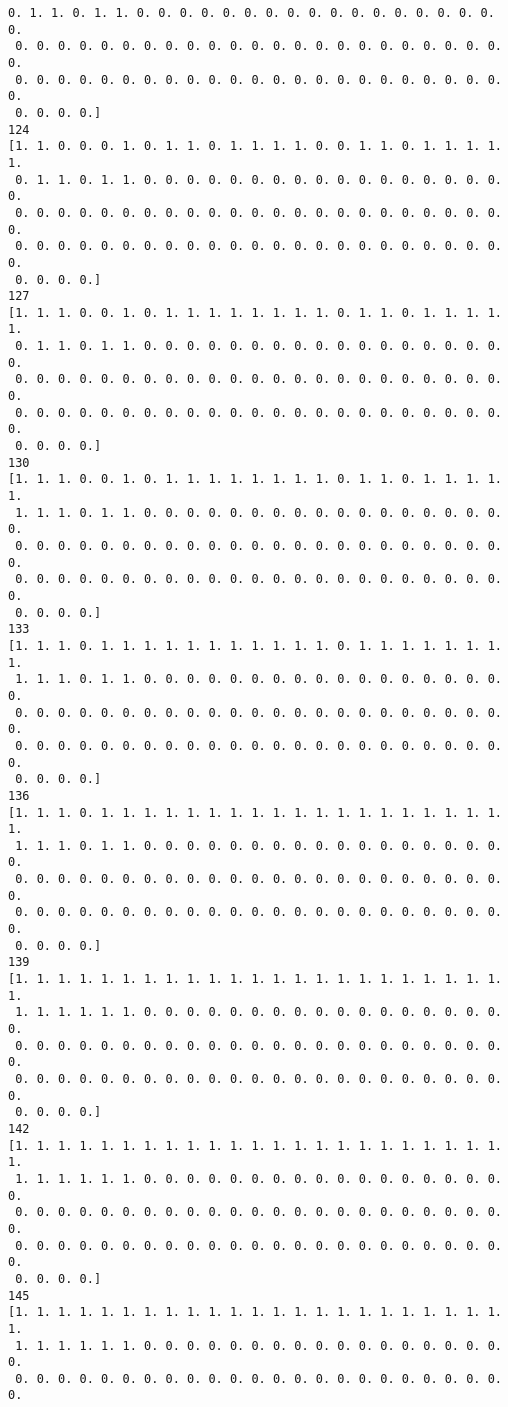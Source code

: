 \documentclass[11pt]{article}
\begin{document}
\begin{Verbatim}[commandchars=\\\{\}]
 0. 1. 1. 0. 1. 1. 0. 0. 0. 0. 0. 0. 0. 0. 0. 0. 0. 0. 0. 0. 0. 0. 0. 0.
 0. 0. 0. 0. 0. 0. 0. 0. 0. 0. 0. 0. 0. 0. 0. 0. 0. 0. 0. 0. 0. 0. 0. 0.
 0. 0. 0. 0. 0. 0. 0. 0. 0. 0. 0. 0. 0. 0. 0. 0. 0. 0. 0. 0. 0. 0. 0. 0.
 0. 0. 0. 0.]
124
[1. 1. 0. 0. 0. 1. 0. 1. 1. 0. 1. 1. 1. 1. 0. 0. 1. 1. 0. 1. 1. 1. 1. 1.
 0. 1. 1. 0. 1. 1. 0. 0. 0. 0. 0. 0. 0. 0. 0. 0. 0. 0. 0. 0. 0. 0. 0. 0.
 0. 0. 0. 0. 0. 0. 0. 0. 0. 0. 0. 0. 0. 0. 0. 0. 0. 0. 0. 0. 0. 0. 0. 0.
 0. 0. 0. 0. 0. 0. 0. 0. 0. 0. 0. 0. 0. 0. 0. 0. 0. 0. 0. 0. 0. 0. 0. 0.
 0. 0. 0. 0.]
127
[1. 1. 1. 0. 0. 1. 0. 1. 1. 1. 1. 1. 1. 1. 1. 0. 1. 1. 0. 1. 1. 1. 1. 1.
 0. 1. 1. 0. 1. 1. 0. 0. 0. 0. 0. 0. 0. 0. 0. 0. 0. 0. 0. 0. 0. 0. 0. 0.
 0. 0. 0. 0. 0. 0. 0. 0. 0. 0. 0. 0. 0. 0. 0. 0. 0. 0. 0. 0. 0. 0. 0. 0.
 0. 0. 0. 0. 0. 0. 0. 0. 0. 0. 0. 0. 0. 0. 0. 0. 0. 0. 0. 0. 0. 0. 0. 0.
 0. 0. 0. 0.]
130
[1. 1. 1. 0. 0. 1. 0. 1. 1. 1. 1. 1. 1. 1. 1. 0. 1. 1. 0. 1. 1. 1. 1. 1.
 1. 1. 1. 0. 1. 1. 0. 0. 0. 0. 0. 0. 0. 0. 0. 0. 0. 0. 0. 0. 0. 0. 0. 0.
 0. 0. 0. 0. 0. 0. 0. 0. 0. 0. 0. 0. 0. 0. 0. 0. 0. 0. 0. 0. 0. 0. 0. 0.
 0. 0. 0. 0. 0. 0. 0. 0. 0. 0. 0. 0. 0. 0. 0. 0. 0. 0. 0. 0. 0. 0. 0. 0.
 0. 0. 0. 0.]
133
[1. 1. 1. 0. 1. 1. 1. 1. 1. 1. 1. 1. 1. 1. 1. 0. 1. 1. 1. 1. 1. 1. 1. 1.
 1. 1. 1. 0. 1. 1. 0. 0. 0. 0. 0. 0. 0. 0. 0. 0. 0. 0. 0. 0. 0. 0. 0. 0.
 0. 0. 0. 0. 0. 0. 0. 0. 0. 0. 0. 0. 0. 0. 0. 0. 0. 0. 0. 0. 0. 0. 0. 0.
 0. 0. 0. 0. 0. 0. 0. 0. 0. 0. 0. 0. 0. 0. 0. 0. 0. 0. 0. 0. 0. 0. 0. 0.
 0. 0. 0. 0.]
136
[1. 1. 1. 0. 1. 1. 1. 1. 1. 1. 1. 1. 1. 1. 1. 1. 1. 1. 1. 1. 1. 1. 1. 1.
 1. 1. 1. 0. 1. 1. 0. 0. 0. 0. 0. 0. 0. 0. 0. 0. 0. 0. 0. 0. 0. 0. 0. 0.
 0. 0. 0. 0. 0. 0. 0. 0. 0. 0. 0. 0. 0. 0. 0. 0. 0. 0. 0. 0. 0. 0. 0. 0.
 0. 0. 0. 0. 0. 0. 0. 0. 0. 0. 0. 0. 0. 0. 0. 0. 0. 0. 0. 0. 0. 0. 0. 0.
 0. 0. 0. 0.]
139
[1. 1. 1. 1. 1. 1. 1. 1. 1. 1. 1. 1. 1. 1. 1. 1. 1. 1. 1. 1. 1. 1. 1. 1.
 1. 1. 1. 1. 1. 1. 0. 0. 0. 0. 0. 0. 0. 0. 0. 0. 0. 0. 0. 0. 0. 0. 0. 0.
 0. 0. 0. 0. 0. 0. 0. 0. 0. 0. 0. 0. 0. 0. 0. 0. 0. 0. 0. 0. 0. 0. 0. 0.
 0. 0. 0. 0. 0. 0. 0. 0. 0. 0. 0. 0. 0. 0. 0. 0. 0. 0. 0. 0. 0. 0. 0. 0.
 0. 0. 0. 0.]
142
[1. 1. 1. 1. 1. 1. 1. 1. 1. 1. 1. 1. 1. 1. 1. 1. 1. 1. 1. 1. 1. 1. 1. 1.
 1. 1. 1. 1. 1. 1. 0. 0. 0. 0. 0. 0. 0. 0. 0. 0. 0. 0. 0. 0. 0. 0. 0. 0.
 0. 0. 0. 0. 0. 0. 0. 0. 0. 0. 0. 0. 0. 0. 0. 0. 0. 0. 0. 0. 0. 0. 0. 0.
 0. 0. 0. 0. 0. 0. 0. 0. 0. 0. 0. 0. 0. 0. 0. 0. 0. 0. 0. 0. 0. 0. 0. 0.
 0. 0. 0. 0.]
145
[1. 1. 1. 1. 1. 1. 1. 1. 1. 1. 1. 1. 1. 1. 1. 1. 1. 1. 1. 1. 1. 1. 1. 1.
 1. 1. 1. 1. 1. 1. 0. 0. 0. 0. 0. 0. 0. 0. 0. 0. 0. 0. 0. 0. 0. 0. 0. 0.
 0. 0. 0. 0. 0. 0. 0. 0. 0. 0. 0. 0. 0. 0. 0. 0. 0. 0. 0. 0. 0. 0. 0. 0.

\end{Verbatim}
\end{document}
